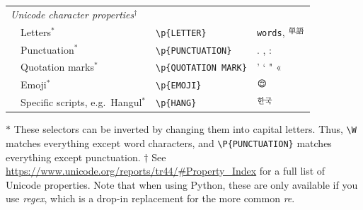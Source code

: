 \begin{table}
{\begin{tabularx}{\textwidth}{lllll}
\multicolumn{4}{l}{\textit{Unicode character properties$^\dagger$}} \\
& Letters$^*$ & \multicolumn{2}{l}{\texttt{\small{\textbackslash{}}p\{LETTER\}}} & \texttt{\small{words}}, \includegraphics[height=1em]{chapter09/tango.pdf}\\
& Punctuation$^*$ &\multicolumn{2}{l}{ \texttt{\small{\textbackslash{}}p\{PUNCTUATION\}}} & . , : \\
& Quotation marks$^*$ & \multicolumn{2}{l}{\texttt{\small{\textbackslash{}}p\{QUOTATION MARK\}}} & ' ` " «  \\
& Emoji$^*$ & \multicolumn{2}{l}{\texttt{\small{\textbackslash{}}p\{EMOJI\}}} & \includegraphics[height=1em]{chapter09/emoji.pdf}  \\
& Specific scripts, e.g.\ Hangul$^*$& \multicolumn{2}{l}{\texttt{\small{\textbackslash{}}p\{HANG\}}} & \includegraphics[height=1em]{chapter09/hangul.pdf}\\

    \bottomrule
  \end{tabularx}}{\small
    $*$ These selectors can be inverted by changing them into  capital letters.   Thus, \texttt{\small{\textbackslash W}} matches everything except word characters, and \texttt{\small{\textbackslash{}}P\{PUNCTUATION\}} matches everything except punctuation.
    $\dagger$ See \url{https://www.unicode.org/reports/tr44/\#Property\_Index} for a full list of Unicode properties. Note that when using Python, these are only available if you use \emph{regex}, which is a drop-in replacement for the more common \emph{re}.}
\end{table}


